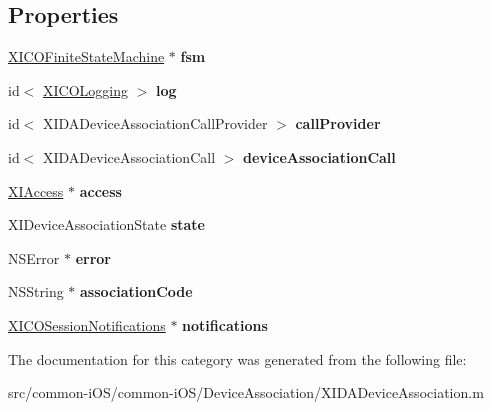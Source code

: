 \subsection*{Properties}
\begin{DoxyCompactItemize}
\item 
\hypertarget{category_x_i_d_a_device_association_07_08_a0f9b906cc5fa0524ba6435f3c2a26dcd}{}\label{category_x_i_d_a_device_association_07_08_a0f9b906cc5fa0524ba6435f3c2a26dcd} 
\hyperlink{class_x_i_c_o_finite_state_machine}{X\+I\+C\+O\+Finite\+State\+Machine} $\ast$ {\bfseries fsm}
\item 
\hypertarget{category_x_i_d_a_device_association_07_08_a4880f467fe67dd89e5686ae180ec73c9}{}\label{category_x_i_d_a_device_association_07_08_a4880f467fe67dd89e5686ae180ec73c9} 
id$<$ \hyperlink{protocol_x_i_c_o_logging-p}{X\+I\+C\+O\+Logging} $>$ {\bfseries log}
\item 
\hypertarget{category_x_i_d_a_device_association_07_08_a7dc49e62f247de26312b10438bfedd23}{}\label{category_x_i_d_a_device_association_07_08_a7dc49e62f247de26312b10438bfedd23} 
id$<$ X\+I\+D\+A\+Device\+Association\+Call\+Provider $>$ {\bfseries call\+Provider}
\item 
\hypertarget{category_x_i_d_a_device_association_07_08_a0b3f08015bebd51a648723ae057c9513}{}\label{category_x_i_d_a_device_association_07_08_a0b3f08015bebd51a648723ae057c9513} 
id$<$ X\+I\+D\+A\+Device\+Association\+Call $>$ {\bfseries device\+Association\+Call}
\item 
\hypertarget{category_x_i_d_a_device_association_07_08_a7c6635c25c3fd89c37e1574e262b54bf}{}\label{category_x_i_d_a_device_association_07_08_a7c6635c25c3fd89c37e1574e262b54bf} 
\hyperlink{class_x_i_access}{X\+I\+Access} $\ast$ {\bfseries access}
\item 
\hypertarget{category_x_i_d_a_device_association_07_08_a0835b9cf9012f9c252a2a79a8dd1c76c}{}\label{category_x_i_d_a_device_association_07_08_a0835b9cf9012f9c252a2a79a8dd1c76c} 
X\+I\+Device\+Association\+State {\bfseries state}
\item 
\hypertarget{category_x_i_d_a_device_association_07_08_ae7be372679b0bd36e0236ac2c230c136}{}\label{category_x_i_d_a_device_association_07_08_ae7be372679b0bd36e0236ac2c230c136} 
N\+S\+Error $\ast$ {\bfseries error}
\item 
\hypertarget{category_x_i_d_a_device_association_07_08_a91b6139d13c2e49aeb30bc1c975a48d5}{}\label{category_x_i_d_a_device_association_07_08_a91b6139d13c2e49aeb30bc1c975a48d5} 
N\+S\+String $\ast$ {\bfseries association\+Code}
\item 
\hypertarget{category_x_i_d_a_device_association_07_08_a469eb171ebbf46941684ece5c8331717}{}\label{category_x_i_d_a_device_association_07_08_a469eb171ebbf46941684ece5c8331717} 
\hyperlink{interface_x_i_c_o_session_notifications}{X\+I\+C\+O\+Session\+Notifications} $\ast$ {\bfseries notifications}
\end{DoxyCompactItemize}


The documentation for this category was generated from the following file\+:\begin{DoxyCompactItemize}
\item 
src/common-\/i\+O\+S/common-\/i\+O\+S/\+Device\+Association/X\+I\+D\+A\+Device\+Association.\+m\end{DoxyCompactItemize}
